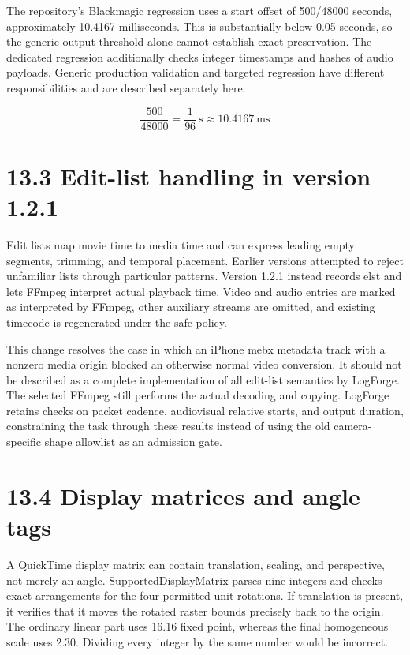 \documentclass[11pt,a4paper,openany]{book}
\begin{document}
The repository's Blackmagic regression uses a start offset of 500/48000 seconds, approximately 10.4167 milliseconds. This is substantially below 0.05 seconds, so the generic output threshold alone cannot establish exact preservation. The dedicated regression additionally checks integer timestamps and hashes of audio payloads. Generic production validation and targeted regression have different responsibilities and are described separately here.


\begin{equation}
\frac{500}{48000}=\frac{1}{96}\ \mathrm{s}\approx10.4167\ \mathrm{ms}
\end{equation}

\section*{13.3 Edit-list handling in version 1.2.1}
Edit lists map movie time to media time and can express leading empty segments, trimming, and temporal placement. Earlier versions attempted to reject unfamiliar lists through particular patterns. Version 1.2.1 instead records elst and lets FFmpeg interpret actual playback time. Video and audio entries are marked as interpreted by FFmpeg, other auxiliary streams are omitted, and existing timecode is regenerated under the safe policy.

This change resolves the case in which an iPhone mebx metadata track with a nonzero media origin blocked an otherwise normal video conversion. It should not be described as a complete implementation of all edit-list semantics by LogForge. The selected FFmpeg still performs the actual decoding and copying. LogForge retains checks on packet cadence, audiovisual relative starts, and output duration, constraining the task through these results instead of using the old camera-specific shape allowlist as an admission gate.


\section*{13.4 Display matrices and angle tags}
A QuickTime display matrix can contain translation, scaling, and perspective, not merely an angle. SupportedDisplayMatrix parses nine integers and checks exact arrangements for the four permitted unit rotations. If translation is present, it verifies that it moves the rotated raster bounds precisely back to the origin. The ordinary linear part uses 16.16 fixed point, whereas the final homogeneous scale uses 2.30. Dividing every integer by the same number would be incorrect.
\end{document}
